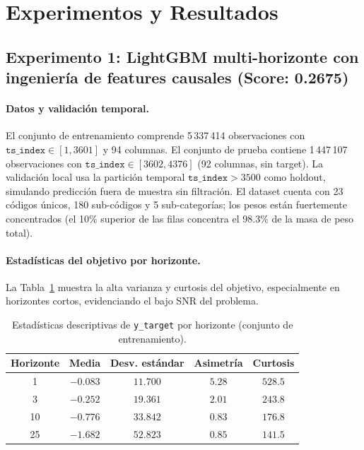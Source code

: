 \documentclass{article}
\begin{document}
\section{Experimentos y Resultados}

\subsection{Experimento 1: LightGBM multi-horizonte con ingeniería de features causales (Score: 0.2675)}

\paragraph{Datos y validación temporal.}
El conjunto de entrenamiento comprende 5\,337\,414 observaciones con $\texttt{ts\_index} \in [1, 3601]$ y 94 columnas. El conjunto de prueba contiene 1\,447\,107 observaciones con $\texttt{ts\_index} \in [3602, 4376]$ (92 columnas, sin target). La validación local usa la partición temporal $\texttt{ts\_index} > 3500$ como holdout, simulando predicción fuera de muestra sin filtración. El dataset cuenta con 23 códigos únicos, 180 sub-códigos y 5 sub-categorías; los pesos están fuertemente concentrados (el 10\% superior de las filas concentra el 98.3\% de la masa de peso total).

\paragraph{Estadísticas del objetivo por horizonte.}
La Tabla~\ref{tab:target_stats} muestra la alta varianza y curtosis del objetivo, especialmente en horizontes cortos, evidenciando el bajo SNR del problema.

\begin{table}[h!]
  \caption{Estadísticas descriptivas de \texttt{y\_target} por horizonte (conjunto de entrenamiento).}
  \label{tab:target_stats}
  \centering
  \begin{tabular}{ccccc}
    \toprule
    Horizonte & Media & Desv. estándar & Asimetría & Curtosis \\
    \midrule
    1  & $-0.083$ & $11.700$ & $ 5.28$ & $528.5$ \\
    3  & $-0.252$ & $19.361$ & $ 2.01$ & $243.8$ \\
    10 & $-0.776$ & $33.842$ & $ 0.83$ & $176.8$ \\
    25 & $-1.682$ & $52.823$ & $ 0.85$ & $141.5$ \\
    \bottomrule
  \end{tabular}
\end{table}
\end{document}

